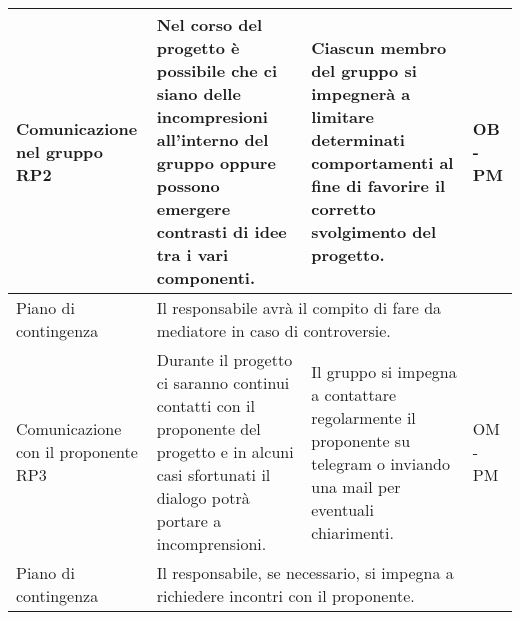 \begin{center}
\begin{longtable}{|p{}|p{}|p{}|p{}|}
		\hline
		\centering Comunicazione nel gruppo RP2& Nel corso del progetto è possibile che ci siano delle incompresioni all'interno del gruppo oppure possono emergere contrasti di idee tra i vari componenti. &Ciascun membro del gruppo si impegnerà a limitare determinati comportamenti al fine di favorire il corretto svolgimento del progetto. & OB - PM \\
		\hline
		\centering Piano di contingenza & \multicolumn{3}{p{0.84\textwidth}}{Il responsabile avrà il compito di fare da mediatore in caso di controversie.} \\
		\hline
		\centering Comunicazione con il proponente RP3& Durante il progetto ci saranno continui contatti con il proponente del progetto e in alcuni casi sfortunati il dialogo potrà portare a incomprensioni.& Il gruppo si impegna a contattare regolarmente il proponente su telegram o inviando una mail per eventuali chiarimenti. & OM - PM \\
		\hline
		\centering Piano di contingenza & \multicolumn{3}{p{0.84\textwidth}}{Il responsabile, se necessario, si impegna a richiedere incontri con il proponente.} \\
		\hline			
	\end{longtable}
\end{center}
